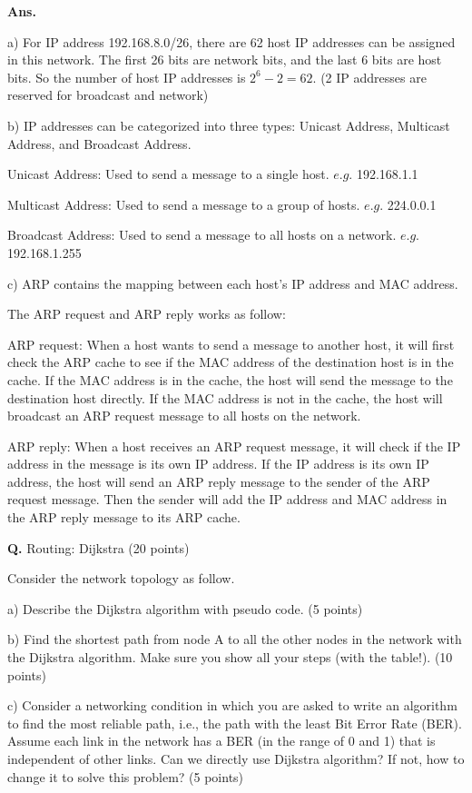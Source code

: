 \documentclass[12pt, a4paper, UTF8, fontset=windows]{ctexbook}
\newcounter{problemname}
\newenvironment{problem}{\begin{shaded}\stepcounter{problemname}\par\noindent\textbf{Q\arabic{problemname}.}}{\end{shaded}\par}
\newenvironment{solution}{\par\noindent\textbf{Ans.}}{\par}
\begin{document}
\begin{solution}
    
    a) For IP address 192.168.8.0/26, there are 62 host IP addresses can be assigned in this network.
    The first 26 bits are network bits, and the last 6 bits are host bits.
    So the number of host IP addresses is $2^6 - 2 = 62$. (2 IP addresses are reserved for broadcast and network)

    b) IP addresses can be categorized into three types: Unicast Address, Multicast Address, and Broadcast Address.

    Unicast Address: Used to send a message to a single host. $e.g.$ 192.168.1.1

    Multicast Address: Used to send a message to a group of hosts. $e.g.$ 224.0.0.1

    Broadcast Address: Used to send a message to all hosts on a network. $e.g.$ 192.168.1.255

    c) ARP contains the mapping between each host's IP address and MAC address. 
    
    The ARP request and ARP reply works as follow:

    ARP request: When a host wants to send a message to another host, it will first check the ARP cache to see if the MAC address of the destination host is in the cache.
    If the MAC address is in the cache, the host will send the message to the destination host directly.
    If the MAC address is not in the cache, the host will broadcast an ARP request message to all hosts on the network.

    ARP reply: When a host receives an ARP request message, it will check if the IP address in the message is its own IP address.
    If the IP address is its own IP address, the host will send an ARP reply message to the sender of the ARP request message.
    Then the sender will add the IP address and MAC address in the ARP reply message to its ARP cache.
\end{solution}

\newpage

\begin{problem}
    Routing: Dijkstra (20 points)

    Consider the network topology as follow.

    a) Describe the Dijkstra algorithm with pseudo code. (5 points)

    b) Find the shortest path from node A to all the other nodes in the network with the Dijkstra
    algorithm. Make sure you show all your steps (with the table!). (10 points)

    c) Consider a networking condition in which you are asked to write an algorithm to find the
    most reliable path, i.e., the path with the least Bit Error Rate (BER). Assume each link
    in the network has a BER (in the range of 0 and 1) that is independent of other links.
    Can we directly use Dijkstra algorithm? If not, how to change it to solve this problem?
    (5 points)
\end{problem}
\end{document}
